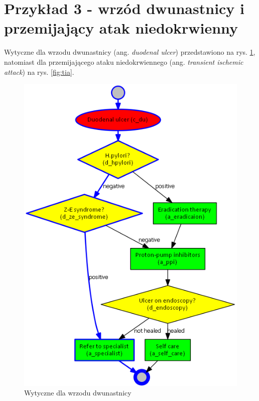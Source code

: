 \newpage
\section{Przykład 3 - wrzód dwunastnicy i przemijający atak niedokrwienny}
Wytyczne dla wrzodu dwunastnicy (ang. \textit{duodenal ulcer}) przedstawiono na rys. \ref{fig:du}, natomiast dla przemijającego ataku niedokrwiennego (ang. \textit{transient ischemic attack}) na rys. \ref{fig:tia}.
\begin{figure}[H]
\centering
\includegraphics[scale=0.45]{img/du.png}
\caption{Wytyczne dla wrzodu dwunastnicy}
\label{fig:du}
\end{figure}


